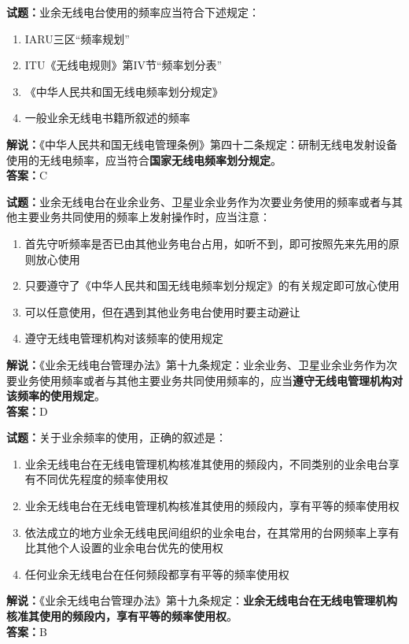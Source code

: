 \documentclass{ctexbook}
\begin{document}
\noindent\textbf{试题：}业余无线电台使用的频率应当符合下述规定：
\begin{enumerate}[leftmargin=3em]
  \item IARU三区“频率规划”
  \item ITU《无线电规则》第IV节“频率划分表”
  \item 《中华人民共和国无线电频率划分规定》
  \item 一般业余无线电书籍所叙述的频率
\end{enumerate}
\noindent\textbf{解说：}《中华人民共和国无线电管理条例》第四十二条规定：研制无线电发射设备使用的无线电频率，应当符合\textbf{国家无线电频率划分规定}。\\\noindent\textbf{答案：}C

\vspace{\baselineskip}

\noindent\textbf{试题：}业余无线电台在业余业务、卫星业余业务作为次要业务使用的频率或者与其他主要业务共同使用的频率上发射操作时，应当注意：
\begin{enumerate}[leftmargin=3em]
  \item 首先守听频率是否已由其他业务电台占用，如听不到，即可按照先来先用的原则放心使用
  \item 只要遵守了《中华人民共和国无线电频率划分规定》的有关规定即可放心使用
  \item 可以任意使用，但在遇到其他业务电台使用时要主动避让
  \item 遵守无线电管理机构对该频率的使用规定
\end{enumerate}
\noindent\textbf{解说：}《业余无线电台管理办法》第十九条规定：业余业务、卫星业余业务作为次要业务使用频率或者与其他主要业务共同使用频率的，应当\textbf{遵守无线电管理机构对该频率的使用规定}。\\\noindent\textbf{答案：}D

\vspace{\baselineskip}

\noindent\textbf{试题：}关于业余频率的使用，正确的叙述是：
\begin{enumerate}[leftmargin=3em]
  \item 业余无线电台在无线电管理机构核准其使用的频段内，不同类别的业余电台享有不同优先程度的频率使用权
  \item 业余无线电台在无线电管理机构核准其使用的频段内，享有平等的频率使用权
  \item 依法成立的地方业余无线电民间组织的业余电台，在其常用的台网频率上享有比其他个人设置的业余电台优先的使用权
  \item 任何业余无线电台在任何频段都享有平等的频率使用权
\end{enumerate}
\noindent\textbf{解说：}《业余无线电台管理办法》第十九条规定：\textbf{业余无线电台在无线电管理机构核准其使用的频段内，享有平等的频率使用权}。\\\noindent\textbf{答案：}B
\end{document}
